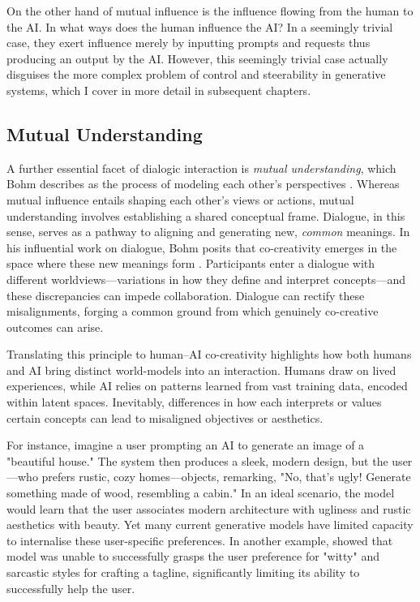 On the other hand of mutual influence is the influence flowing from the human to the AI. In what ways does the human influence the AI? In a seemingly trivial case, they exert influence merely by inputting prompts and requests thus producing an output by the AI. However, this seemingly trivial case actually disguises the more complex problem of control and steerability in generative systems, which I cover in more detail in subsequent chapters.

\subsection{Mutual Understanding}

A further essential facet of dialogic interaction is \textit{mutual understanding}, which Bohm describes as the process of modeling each other's perspectives \cite{Bohm1996-fo}. Whereas mutual influence entails shaping each other's views or actions, mutual understanding involves establishing a shared conceptual frame. Dialogue, in this sense, serves as a pathway to aligning and generating new, \textit{common} meanings. In his influential work on dialogue, Bohm posits that co-creativity emerges in the space where these new meanings form \cite{Bohm1996-fo}. Participants enter a dialogue with different worldviews—variations in how they define and interpret concepts—and these discrepancies can impede collaboration. Dialogue can rectify these misalignments, forging a common ground from which genuinely co-creative outcomes can arise.

Translating this principle to human–AI co-creativity highlights how both humans and AI bring distinct world-models into an interaction. Humans draw on lived experiences, while AI relies on patterns learned from vast training data, encoded within latent spaces. Inevitably, differences in how each interprets or values certain concepts can lead to misaligned objectives or aesthetics.

For instance, imagine a user prompting an AI to generate an image of a "beautiful house." The system then produces a sleek, modern design, but the user—who prefers rustic, cozy homes—objects, remarking, "No, that's ugly! Generate something made of wood, resembling a cabin." In an ideal scenario, the model would learn that the user associates modern architecture with ugliness and rustic aesthetics with beauty. Yet many current generative models have limited capacity to internalise these user-specific preferences. In another example, \cite{Bown2024-yx} showed that model was unable to successfully grasps the user preference for "witty" and sarcastic styles for crafting a tagline, significantly limiting its ability to successfully help the user. 

